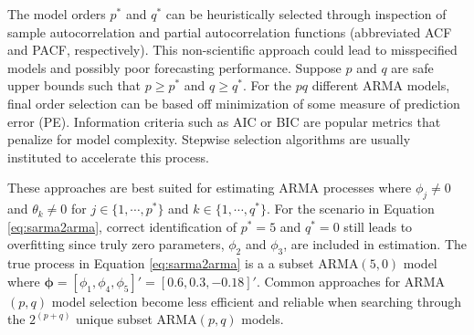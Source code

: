 The model orders $p^*$ and $q^*$ can be heuristically selected through inspection of sample autocorrelation and partial autocorrelation functions (abbreviated ACF and PACF, respectively). This non-scientific approach could lead to misspecified models and possibly poor forecasting performance. Suppose $p$ and $q$ are safe upper bounds such that $p\geq p^*$ and $q\geq q^*$. For the $pq$ different ARMA models, final order selection can be based off minimization of some measure of prediction error (PE). Information criteria such as AIC \citep{Akaike1974} or BIC \citep{Schwarz1978} are popular metrics that penalize for model complexity. Stepwise selection algorithms are usually instituted to accelerate this process.

These approaches are best suited for estimating ARMA processes where $\phi_j\neq 0$ and $\theta_k \neq 0$ for $j\in\{1,\cdots,p^*\}$ and $k\in\{1,\cdots,q^*\}$. For the scenario in Equation \ref{eq:sarma2arma}, correct identification of $p^*=5$ and $q^*=0$ still leads to overfitting since truly zero parameters, $\phi_2$ and $\phi_3$, are included in estimation. The true process in Equation \ref{eq:sarma2arma} is a a subset ARMA$(5,0)$ model where $\bm{\phi}=[\phi_1,\phi_4,\phi_5]'=[0.6,0.3,-0.18]'$. Common approaches for ARMA$(p,q)$ model selection become less efficient and reliable when searching through the $2^{(p+q)}$ unique subset ARMA$(p,q)$ models.	

